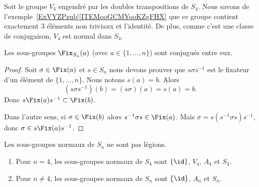 \begin{normaltext}     \label{NORMooQAZTooBQLqDn}
    Soit le groupe \( V_4\) engendré par les doubles transpositions de \( S_4\). Nous savons de l'exemple~\ref{ExVYZPzub}\ref{ITEMooGCMYooKZgFHX} que ce groupe contient exactement \( 3\) éléments non triviaux et l'identité. De plus, comme c'est une classe de conjugaison, \( V_4\) est normal dans \( S_4\).
\end{normaltext}

\begin{lemma}
    Les sous-groupes \( \Fix_{S_n}(a)\) (avec \( a\in\{ 1,\ldots, n \}\)) sont conjugués entre eux.
\end{lemma}

\begin{proof}
    Soit \( \sigma\in \Fix(a)\) et \( s\in S_n\) nous devons prouver que \( s \sigma s^{-1}\) est le fixateur d'un élément de \( \{ 1,\ldots, n \}\). Nous notons \( s(a)=b\). Alors
    \begin{equation}
        (s\sigma s^{-1})(b)=(s\sigma)(a)=s(a)=b.
    \end{equation}
    Donc \( s\Fix(a)s^{-1}\subset \Fix(b)\).

    Dans l'autre sens, si \( \sigma\in \Fix(b)\) alors \( s^{-1} \sigma s\in\Fix(a)\). Mais \( \sigma=s(s^{-1}\sigma s)s^{-1}\), donc \( \sigma\in s\Fix(a)s^{-1}\).
\end{proof}

\begin{proposition}     \label{PROPooOTJAooUbzGZm}
    Les sous-groupes normaux de \( S_n\) ne sont pas légions.
    \begin{enumerate}
        \item
            Pour \( n=4\), les sous-groupes normaux de \( S_4\) sont \(  \{ \id \}  \), \( V_4\), \( A_4\) et \( S_4\).
        \item
            Pour \( n\neq 4\), les sous-groupes normaux de \( S_n\) sont \( \{ \id \}\), \( A_n\) et \( S_n\).
    \end{enumerate}
\end{proposition}

